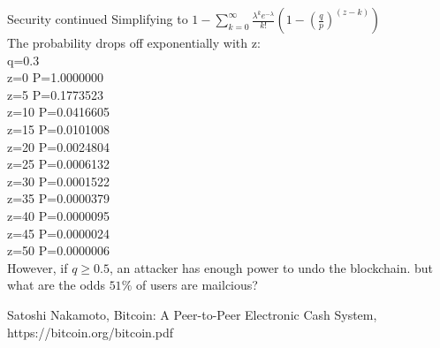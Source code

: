\documentclass{beamer}
\begin{document}
\begin{frame}
{\Huge Security continued}
Simplifying to $1 - \sum_{k = 0}^{\infty} \frac{\lambda^k e^{-\lambda}}{k!} (1- (\frac{q}{p})^{(z-k)})$\\
The probability drops off exponentially with z:\\
q=0.3\\
z=0    P=1.0000000\\
z=5    P=0.1773523\\
z=10   P=0.0416605\\
z=15   P=0.0101008\\
z=20   P=0.0024804\\
z=25   P=0.0006132\\
z=30   P=0.0001522\\
z=35   P=0.0000379\\
z=40   P=0.0000095\\
z=45   P=0.0000024\\
z=50   P=0.0000006\\
However, if $q \geq 0.5$, an attacker has enough power to undo the blockchain. but what are the odds $ 51\%$ of users are mailcious?
\end{frame}

\begin{frame}
Satoshi Nakamoto, Bitcoin: A Peer-to-Peer Electronic Cash System, https://bitcoin.org/bitcoin.pdf
\end{frame}
\end{document}
